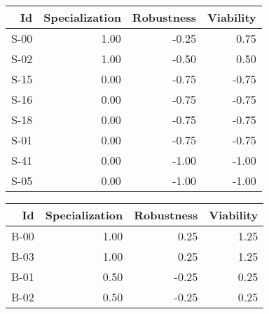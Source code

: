 


\begin{tabular}{ | r | r | r | r | }
    \hline
                    Id  &  Specialization  &      Robustness  &       Viability  \\
    \hline
    \hline
                  S-00  &            1.00  &           -0.25  &            0.75  \\
    \hline
                  S-02  &            1.00  &           -0.50  &            0.50  \\
    \hline
                  S-15  &            0.00  &           -0.75  &           -0.75  \\
    \hline
                  S-16  &            0.00  &           -0.75  &           -0.75  \\
    \hline
                  S-18  &            0.00  &           -0.75  &           -0.75  \\
    \hline
                  S-01  &            0.00  &           -0.75  &           -0.75  \\
    \hline
                  S-41  &            0.00  &           -1.00  &           -1.00  \\
    \hline
                  S-05  &            0.00  &           -1.00  &           -1.00  \\
    \hline
\end{tabular}


\begin{tabular}{ | r | r | r | r | }
    \hline
                    Id  &  Specialization  &      Robustness  &       Viability  \\
    \hline
    \hline
                  B-00  &            1.00  &            0.25  &            1.25  \\
    \hline
                  B-03  &            1.00  &            0.25  &            1.25  \\
    \hline
                  B-01  &            0.50  &           -0.25  &            0.25  \\
    \hline
                  B-02  &            0.50  &           -0.25  &            0.25  \\
    \hline
\end{tabular}


